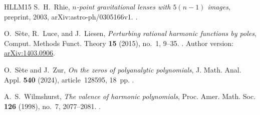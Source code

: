 \documentclass[UTF8,11pt]{ctexart}
\theoremstyle{definition}
\numberwithin{equation}{section}
\begin{document}
\begin{thebibliography}{HLLM15}
S.~H.~Rhie,
\emph{$n$-point gravitational lenses with $5(n-1)$ images},
preprint, 2003, arXiv:astro-ph/0305166v1.
.

O.~S\`ete, R.~Luce, and J.~Liesen,
\emph{Perturbing rational harmonic functions by poles},
Comput. Methods Funct. Theory \textbf{15} (2015), no.~1, 9--35.
.
Author version: \href{https://arxiv.org/abs/1403.0906}{arXiv:1403.0906}.

O.~S\`ete and J.~Zur,
\emph{On the zeros of polyanalytic polynomials},
J. Math. Anal. Appl. \textbf{540} (2024), article~128595, 18~pp.
.

A.~S.~Wilmshurst,
\emph{The valence of harmonic polynomials},
Proc. Amer. Math. Soc. \textbf{126} (1998), no.~7, 2077--2081.
.

\end{thebibliography}
\end{document}
